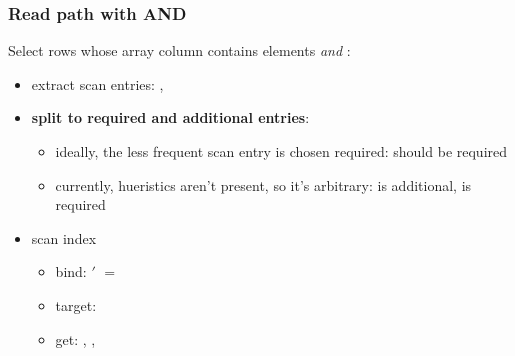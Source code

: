 \begin{frame}
  \frametitle{Read path with AND}
  Select rows whose array column contains elements  \emph{and}
  :

  \pause

  \begin{itemize}
    \item extract scan entries: , 
      \pause
    \item \textbf{split to required and additional entries}:
      \pause
      \begin{itemize}
        \item ideally, the less frequent scan entry is chosen required:
           should be required
          \pause
        \item currently, hueristics aren't present, so it's arbitrary:
           is additional,  is required
      \end{itemize}
      \pause
    \item scan index
      \begin{itemize}
        \item bind: $'$ $=$ 
        \item target: 
          \pause
        \item get: , , 
      \end{itemize}
  \end{itemize}
\end{frame}

